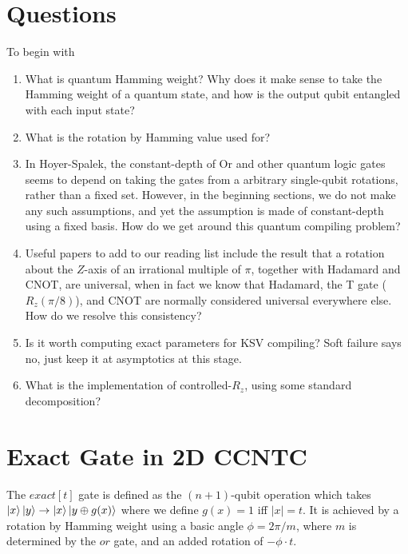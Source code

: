 \documentclass{article}
\begin{document}
\section{Questions}

To begin with

\begin{enumerate}
\item
What is quantum Hamming weight? Why does it make sense to take the
Hamming weight of a quantum state, and how is the output qubit entangled
with each input state?

\item
What is the rotation by Hamming value used for?

\item
In Hoyer-Spalek, the constant-depth of Or and other quantum logic gates
seems to depend on taking the gates from a arbitrary single-qubit
rotations, rather than a fixed set. However, in the beginning sections,
we do not make any such assumptions, and yet the assumption is made
of constant-depth using a fixed basis. How do we get around this
quantum compiling problem?

\item
Useful papers to add to our reading list include the result that
a rotation about the $Z$-axis of an irrational multiple of $\pi$,
together with Hadamard and CNOT, are universal, when in fact we
know that Hadamard, the T gate ($R_z(\pi/8)$), and CNOT are normally
considered universal everywhere else. How do we resolve this consistency?

\item
Is it worth computing exact parameters for KSV compiling? Soft failure
says no, just keep it at asymptotics at this stage.

\item
What is the implementation of controlled-$R_z$, using some
standard decomposition?

\end{enumerate}

\section{Exact Gate in 2D CCNTC}

The $exact[t]$ gate is defined as the $(n+1)$-qubit operation which takes
$\left\vert{x}\right\rangle\left\vert{y}\right\rangle \rightarrow \left\vert{x}\right\rangle\left\vert{y \oplus g(x)}\right\rangle$ where
we define $g(x) = 1$ iff $|x| = t$. It is achieved by a rotation by Hamming
weight using a basic angle $\phi = 2\pi / m$, where $m$ is determined by
the $or$ gate, and an added rotation of $-\phi\cdot t$.
\end{document}
